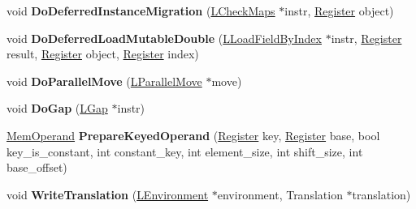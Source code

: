 \begin{DoxyCompactItemize}
\item 
void {\bfseries Do\+Deferred\+Instance\+Migration} (\hyperlink{classv8_1_1internal_1_1_l_check_maps}{L\+Check\+Maps} $\ast$instr, \hyperlink{structv8_1_1internal_1_1_register}{Register} object)\hypertarget{classv8_1_1internal_1_1_l_code_gen_a9a11a557dc4a35165efe7432b91cce0c}{}\label{classv8_1_1internal_1_1_l_code_gen_a9a11a557dc4a35165efe7432b91cce0c}

\item 
void {\bfseries Do\+Deferred\+Load\+Mutable\+Double} (\hyperlink{classv8_1_1internal_1_1_l_load_field_by_index}{L\+Load\+Field\+By\+Index} $\ast$instr, \hyperlink{structv8_1_1internal_1_1_register}{Register} result, \hyperlink{structv8_1_1internal_1_1_register}{Register} object, \hyperlink{structv8_1_1internal_1_1_register}{Register} index)\hypertarget{classv8_1_1internal_1_1_l_code_gen_a9a814347358bb30ae26293358697e12f}{}\label{classv8_1_1internal_1_1_l_code_gen_a9a814347358bb30ae26293358697e12f}

\item 
void {\bfseries Do\+Parallel\+Move} (\hyperlink{classv8_1_1internal_1_1_l_parallel_move}{L\+Parallel\+Move} $\ast$move)\hypertarget{classv8_1_1internal_1_1_l_code_gen_ac76d169118f379bb8eb597ec360ca6e1}{}\label{classv8_1_1internal_1_1_l_code_gen_ac76d169118f379bb8eb597ec360ca6e1}

\item 
void {\bfseries Do\+Gap} (\hyperlink{classv8_1_1internal_1_1_l_gap}{L\+Gap} $\ast$instr)\hypertarget{classv8_1_1internal_1_1_l_code_gen_a349f26d8f5d21ea5ef25e7855317a575}{}\label{classv8_1_1internal_1_1_l_code_gen_a349f26d8f5d21ea5ef25e7855317a575}

\item 
\hyperlink{classv8_1_1internal_1_1_mem_operand}{Mem\+Operand} {\bfseries Prepare\+Keyed\+Operand} (\hyperlink{structv8_1_1internal_1_1_register}{Register} key, \hyperlink{structv8_1_1internal_1_1_register}{Register} base, bool key\+\_\+is\+\_\+constant, int constant\+\_\+key, int element\+\_\+size, int shift\+\_\+size, int base\+\_\+offset)\hypertarget{classv8_1_1internal_1_1_l_code_gen_a3b515037866a0dd7cc3f92d474c36b43}{}\label{classv8_1_1internal_1_1_l_code_gen_a3b515037866a0dd7cc3f92d474c36b43}

\item 
void {\bfseries Write\+Translation} (\hyperlink{classv8_1_1internal_1_1_l_environment}{L\+Environment} $\ast$environment, Translation $\ast$translation)\hypertarget{classv8_1_1internal_1_1_l_code_gen_aa6c0dc6868c8926d71543f7d35675b7f}{}\label{classv8_1_1internal_1_1_l_code_gen_aa6c0dc6868c8926d71543f7d35675b7f}


\end{DoxyCompactItemize}
